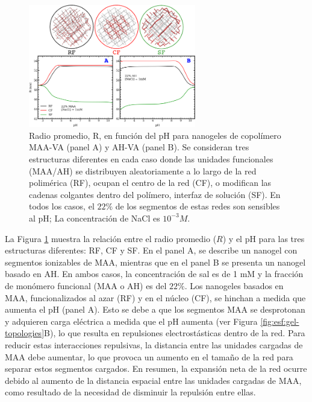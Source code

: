 \begin{figure}[!htb]
     \centering
     \includegraphics[width=0.65\textwidth]{Figures/graphs-gel2/rr-nano-pH.pdf}
     \caption{Radio promedio, R, en funci\'on del pH para nanogeles de copol\'imero MAA-VA (panel A) y AH-VA (panel B).
     	Se consideran tres estructuras diferentes en cada caso donde las unidades funcionales (MAA/AH) se distribuyen aleatoriamente a lo largo de la red polim\'erica (RF), ocupan el centro de la red (CF), o modifican las cadenas colgantes dentro del pol\'imero, interfaz de soluci\'on (SF).
     	En todos los casos, el $22\%$ de los segmentos de estas redes son sensibles al pH; La concentraci\'on de NaCl es $10^{-3}M$.}
     \label{fig:esf:gel-charge-MAA-AH}
\end{figure}


La Figura \ref{fig:esf:gel-charge-MAA-AH} muestra la relaci\'on entre el radio promedio ($R$) y el pH para las tres estructuras diferentes: RF, CF y SF. En el panel A, se describe un nanogel con segmentos ionizables de MAA, mientras que en el panel B se presenta un nanogel basado en AH. En ambos casos, la concentraci\'on de sal es de 1 mM y la fracci\'on de mon\'omero funcional (MAA o AH) es del $22\%$. Los nanogeles basados en MAA, funcionalizados al azar (RF) y en el n\'ucleo (CF), se hinchan a medida que aumenta el pH (panel A). Esto se debe a que los segmentos MAA se desprotonan y adquieren carga el\'ectrica a medida que el pH aumenta (ver Figura \ref{fig:esf:gel-topologies}B), lo que resulta en repulsiones electrost\'asticas dentro de la red. Para reducir estas interacciones repulsivas, la distancia entre las unidades cargadas de MAA debe aumentar, lo que provoca un aumento en el tama\~no de la red para separar estos segmentos cargados. En resumen, la expansi\'on neta de la red ocurre debido al aumento de la distancia espacial entre las unidades cargadas de MAA, como resultado de la necesidad de disminuir la repulsi\'on entre ellas.



